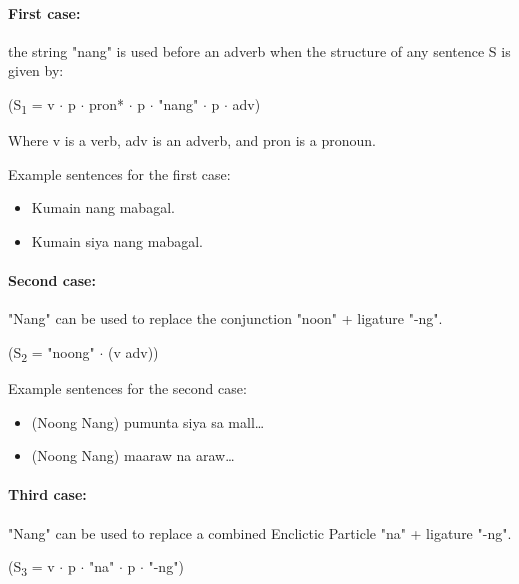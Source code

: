 \paragraph{First case:} the string "nang" is used before an adverb when the
structure of any sentence S is given by:

\begin{center}
      (S\textsubscript{1} = v \(\cdot\) p \(\cdot\) pron* \(\cdot\) p \(\cdot\)
      "nang" \(\cdot\) p \(\cdot\) adv)
\end{center}

Where v is a verb, adv is an adverb, and pron is a pronoun.

\begin{example}
      Example sentences for the first case:
\end{example}
\begin{itemize}
      \item Kumain nang mabagal.
      \item             Kumain siya nang mabagal.

\end{itemize}

\paragraph{Second case:} "Nang" can be used to replace the conjunction "noon" +
ligature "-ng".

\begin{center}
      (S\textsubscript{2} = "noong" \(\cdot\) (v {\textpipe} adv))
\end{center}

\begin{example}
      Example sentences for the second case:
\end{example}

\begin{itemize}
      \item (Noong {\textpipe} Nang) pumunta siya sa mall…
      \item (Noong {\textpipe} Nang) maaraw na araw…
\end{itemize}

\paragraph{Third case:} "Nang" can be used to replace a combined Enclictic Particle
"na" + ligature "-ng".

\begin{center}
      (S\textsubscript{3} = v \(\cdot\) p \(\cdot\) "na" \(\cdot\) p \(\cdot\)
      "-ng")
\end{center}

